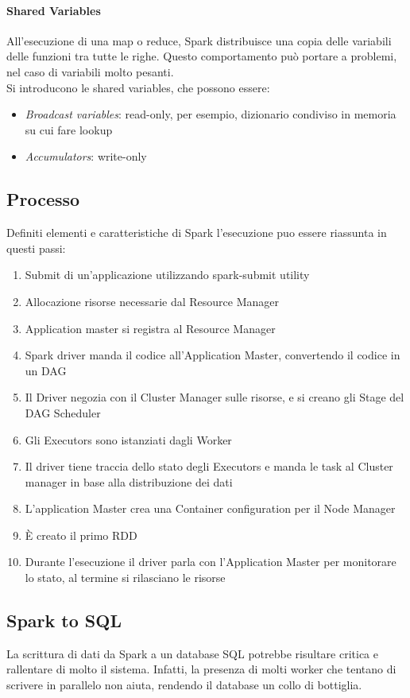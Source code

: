 \paragraph{Shared Variables}
All'esecuzione di una map o reduce, Spark distribuisce una copia delle 
variabili delle funzioni tra tutte le righe. Questo comportamento 
può portare a problemi, nel caso di variabili molto pesanti.\\
Si introducono le shared variables, che possono essere:
\begin{itemize}
    \item \emph{Broadcast variables}: read-only, per esempio, dizionario 
    condiviso in memoria su cui fare lookup
    \item \emph{Accumulators}: write-only
\end{itemize}

\subsection{Processo}
Definiti elementi e caratteristiche di Spark l'esecuzione puo essere riassunta 
in questi passi:
\begin{enumerate}
    \item Submit di un'applicazione utilizzando spark-submit utility
    \item Allocazione risorse necessarie dal Resource Manager
    \item Application master si registra al Resource Manager
    \item Spark driver manda il codice all'Application Master, convertendo il codice
    in un DAG
    \item Il Driver negozia con il Cluster Manager sulle risorse, e si creano gli Stage del 
    DAG Scheduler
    \item Gli Executors sono istanziati dagli Worker
    \item Il driver tiene traccia dello stato degli Executors e manda le task al 
    Cluster manager in base alla distribuzione dei dati
    \item L'application Master crea una Container configuration per il Node Manager
    \item È creato il primo RDD
    \item Durante l'esecuzione il driver parla con l'Application Master per monitorare
    lo stato, al termine si rilasciano le risorse
\end{enumerate}

\subsection{Spark to SQL}
La scrittura di dati da Spark a un database SQL potrebbe risultare critica e 
rallentare di molto il sistema. Infatti, la presenza di molti worker che tentano
di scrivere in parallelo non aiuta, rendendo il database un collo di bottiglia.

